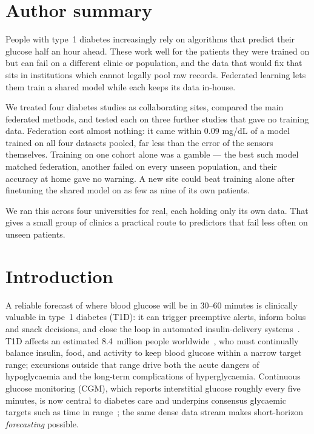 \documentclass[10pt,letterpaper]{article}
\begin{document}
\section*{Author summary}
People with type~1 diabetes increasingly rely on algorithms that predict their
glucose half an hour ahead. These work well for the patients they were trained
on but can fail on a different clinic or population, and the data that would
fix that sits in institutions which cannot legally pool raw records. Federated
learning lets them train a shared model while each keeps its data in-house.

We treated four diabetes studies as collaborating sites, compared the main
federated methods, and tested each on three further studies that gave no
training data. Federation cost almost nothing: it came within $0.09$ mg/dL of a
model trained on all four datasets pooled, far less than the error of the
sensors themselves. Training on one cohort alone was a gamble --- the best such
model matched federation, another failed on every unseen population, and their
accuracy at home gave no warning. A new site could beat training alone after
finetuning the shared model on as few as nine of its own patients.

We ran this across four universities for real, each holding only its own data.
That gives a small group of clinics a practical route to predictors that fail
less often on unseen patients.

\clearpage
{}
\linenumbers

\section*{Introduction}

A reliable forecast of where blood glucose will be in 30--60 minutes is
clinically valuable in type~1 diabetes (T1D): it can trigger preemptive
alerts, inform bolus and snack decisions, and close the loop in automated
insulin-delivery systems~\cite{vettoretti2020advanced,bekiari2018ap}. T1D
affects an estimated 8.4~million people
worldwide~\cite{idf2021,gregory2022t1dindex}, who must continually balance
insulin, food, and activity to keep blood glucose within a narrow target
range; excursions outside that range drive both the acute dangers of
hypoglycaemia and the long-term complications of hyperglycaemia. Continuous
glucose monitoring (CGM), which reports interstitial glucose roughly every
five minutes, is now central to diabetes care and underpins consensus
glycaemic targets such as time in range~\cite{battelino2019tir}; the same
dense data stream makes short-horizon \emph{forecasting} possible.
\end{document}
